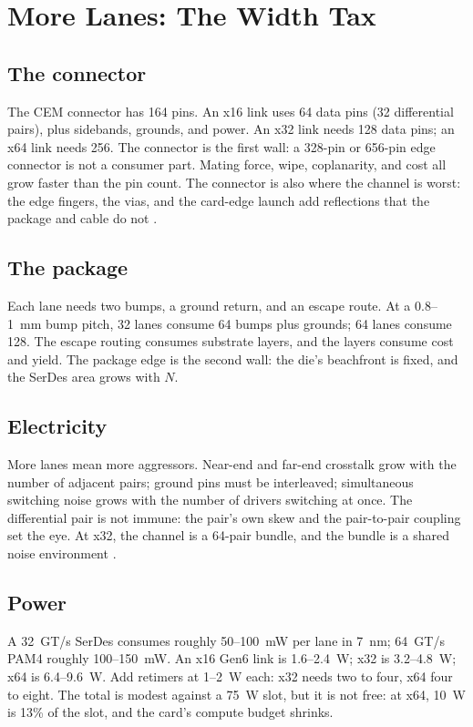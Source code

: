 \documentclass[10pt,letterpaper]{article}
\begin{document}
\section{More Lanes: The Width Tax}
\label{sec:more}

\subsection{The connector}

The CEM connector has 164 pins. An x16 link uses 64 data pins (32 differential pairs), plus sidebands, grounds, and power. An x32 link needs 128 data pins; an x64 link needs 256. The connector is the first wall: a 328-pin or 656-pin edge connector is not a consumer part. Mating force, wipe, coplanarity, and cost all grow faster than the pin count. The connector is also where the channel is worst: the edge fingers, the vias, and the card-edge launch add reflections that the package and cable do not \cite{cem}.

\subsection{The package}

Each lane needs two bumps, a ground return, and an escape route. At a 0.8--1~mm bump pitch, 32 lanes consume 64 bumps plus grounds; 64 lanes consume 128. The escape routing consumes substrate layers, and the layers consume cost and yield. The package edge is the second wall: the die's beachfront is fixed, and the SerDes area grows with $N$.

\subsection{Electricity}

More lanes mean more aggressors. Near-end and far-end crosstalk grow with the number of adjacent pairs; ground pins must be interleaved; simultaneous switching noise grows with the number of drivers switching at once. The differential pair is not immune: the pair's own skew and the pair-to-pair coupling set the eye. At x32, the channel is a 64-pair bundle, and the bundle is a shared noise environment \cite{dally}.

\subsection{Power}

A 32~GT/s SerDes consumes roughly 50--100~mW per lane in 7~nm; 64~GT/s PAM4 roughly 100--150~mW. An x16 Gen6 link is 1.6--2.4~W; x32 is 3.2--4.8~W; x64 is 6.4--9.6~W. Add retimers at 1--2~W each: x32 needs two to four, x64 four to eight. The total is modest against a 75~W slot, but it is not free: at x64, 10~W is 13\% of the slot, and the card's compute budget shrinks.
\end{document}
